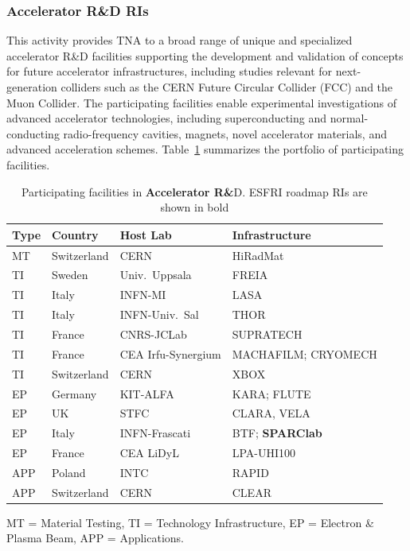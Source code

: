 \subsubsection{Accelerator R\&D RIs}
This activity provides TNA  to a broad range of unique and specialized accelerator R\&D facilities supporting the development and validation of concepts for future accelerator infrastructures, including studies relevant for next-generation colliders such as the CERN Future Circular Collider (FCC) and the Muon Collider. The participating facilities enable experimental investigations of advanced accelerator technologies, including superconducting and normal-conducting radio-frequency cavities, magnets, novel accelerator materials, and advanced acceleration schemes. Table~\ref{tabl:wp3-ris} summarizes the portfolio of participating facilities.
\begin{table}[htb]
\centering
\caption{Participating facilities in \textbf{Accelerator R\&}D. ESFRI roadmap RIs are shown in bold}
\small
\begin{tabular}{
p{}
p{}
p{}
p{}
}
\toprule
\textbf{Type} & \textbf{Country} & \textbf{Host Lab} & \textbf{Infrastructure} \\
\midrule
MT & Switzerland & CERN & HiRadMat \\
TI & Sweden & Univ.\ Uppsala & FREIA \\
TI & Italy & INFN-MI & LASA \\
TI & Italy & INFN-Univ.\ Sal & THOR \\
TI & France & CNRS-JCLab & SUPRATECH \\
TI & France & CEA Irfu-Syn\-ergium & MACHAFILM; CRYOMECH \\
TI & Switzerland & CERN & XBOX \\
EP & Germany & KIT-ALFA & KARA; FLUTE \\
EP & UK & STFC & CLARA, VELA \\
EP & Italy & INFN-Frascati & BTF; \textbf{SPARClab} \\
EP & France & CEA LiDyL & LPA-UHI100 \\
APP & Poland & INTC & RAPID \\
APP & Switzerland & CERN & CLEAR \\
\bottomrule
\end{tabular}

\vspace{1mm}
\raggedright
\footnotesize
MT = Material Testing,
TI = Technology Infrastructure,
EP = Electron \& Plasma Beam,
APP = Applications.
\label{tabl:wp3-ris}
\end{table}

